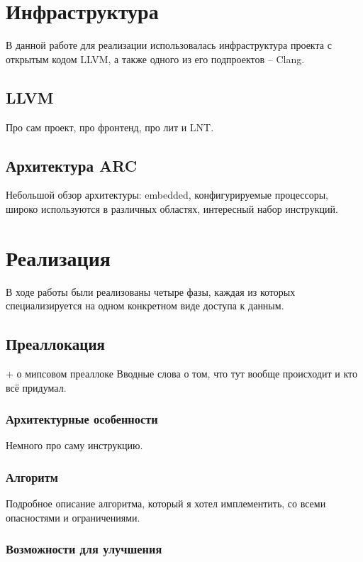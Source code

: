 \documentclass[12pt,a4paper]{article}
\begin{document}
\section{Инфраструктура}

В данной работе для реализации использовалась инфраструктура проекта с открытым кодом LLVM, а также одного из его подпроектов -- Clang.

\subsection{LLVM}

Про сам проект, про фронтенд, про лит и LNT.

\subsection{Архитектура ARC}

Небольшой обзор архитектуры: embedded, конфигурируемые процессоры, широко используются в различных областях, интересный набор инструкций.

\section{Реализация}

В ходе работы были реализованы четыре фазы, каждая из которых специализируется на одном конкретном виде доступа к данным.

\subsection{Преаллокация}

+ о мипсовом преаллоке
Вводные слова о том, что тут вообще происходит и кто всё придумал.

\subsubsection{Архитектурные особенности}

Немного про саму инструкцию.

\subsubsection{Алгоритм}

Подробное описание алгоритма, который я хотел имплементить, со всеми опасностями и ограничениями.

\subsubsection{Возможности для улучшения}
\end{document}
